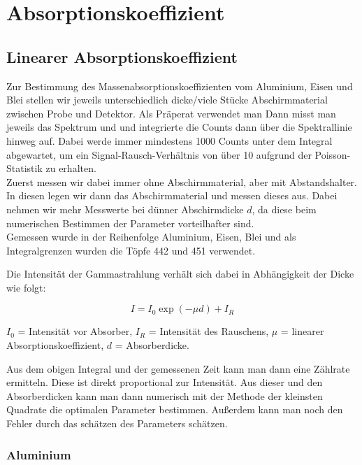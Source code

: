 \clearpage
\section{Absorptionskoeffizient}
\label{section:Absorbtionskoeff}

\subsection{Linearer Absorptionskoeffizient}

Zur Bestimmung des Massenabsorptionskoeffizienten vom Aluminium, Eisen und Blei stellen wir jeweils 
unterschiedlich dicke/viele Stücke Abschirmmaterial zwischen Probe und Detektor. Als Präperat verwendet man  Dann misst man jeweils das Spektrum und und 
integrierte die Counts dann über die Spektrallinie hinweg auf. Dabei werde immer mindestens 1000 Counts unter dem Integral abgewartet, 
um ein Signal-Rausch-Verhältnis von über 10 aufgrund der Poisson-Statistik zu erhalten. \\
Zuerst messen wir dabei immer ohne Abschirmmaterial, aber mit Abstandshalter. In diesen legen wir dann das Abschirmmaterial und messen dieses aus. 
Dabei nehmen wir mehr Messwerte bei dünner Abschirmdicke $d$, da diese beim numerischen Bestimmen der Parameter vorteilhafter sind. \\
Gemessen wurde in der Reihenfolge Aluminium, Eisen, Blei und als Integralgrenzen wurden die Töpfe 442 und 451 verwendet.

Die Intensität der Gammastrahlung verhält sich dabei in Abhängigkeit der Dicke wie folgt:

\begin{equation}
    I = I_0 \exp(- \mu d) +I_R
    \label{Intensitaet}
\end{equation}

$I_0$ = Intensität vor Absorber, $I_R$ = Intensität des Rauschens, $\mu$ = linearer Absorptionskoeffizient, $d$ = Absorberdicke. 

Aus dem obigen Integral und der gemessenen Zeit kann man dann eine Zählrate ermitteln. Diese ist direkt proportional zur Intensität. 
Aus dieser und den Absorberdicken kann man dann numerisch mit der Methode der kleinsten Quadrate die optimalen Parameter bestimmen. Außerdem kann man 
noch den Fehler durch das schätzen des Parameters schätzen.\\

\subsubsection*{Aluminium}


